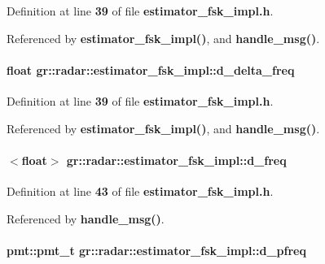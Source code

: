Definition at line {\bf 39} of file {\bf estimator\+\_\+fsk\+\_\+impl.\+h}.



Referenced by {\bf estimator\+\_\+fsk\+\_\+impl()}, and {\bf handle\+\_\+msg()}.

\paragraph[{d\+\_\+delta\+\_\+freq}]{\setlength{\rightskip}{0pt plus 5cm}float gr\+::radar\+::estimator\+\_\+fsk\+\_\+impl\+::d\+\_\+delta\+\_\+freq}\label{classgr_1_1radar_1_1estimator__fsk__impl_a1ffe1187745411015b8bb2a5121fae5b}


Definition at line {\bf 39} of file {\bf estimator\+\_\+fsk\+\_\+impl.\+h}.



Referenced by {\bf estimator\+\_\+fsk\+\_\+impl()}, and {\bf handle\+\_\+msg()}.

\paragraph[{d\+\_\+freq}]{$<$float$>$ gr\+::radar\+::estimator\+\_\+fsk\+\_\+impl\+::d\+\_\+freq}\label{classgr_1_1radar_1_1estimator__fsk__impl_ad594bbcbe2f3bb3b717ab3f590a856b1}


Definition at line {\bf 43} of file {\bf estimator\+\_\+fsk\+\_\+impl.\+h}.



Referenced by {\bf handle\+\_\+msg()}.

\paragraph[{d\+\_\+pfreq}]{\setlength{\rightskip}{0pt plus 5cm}pmt\+::pmt\+\_\+t gr\+::radar\+::estimator\+\_\+fsk\+\_\+impl\+::d\+\_\+pfreq}\label{classgr_1_1radar_1_1estimator__fsk__impl_aecf49492caf4b497f4c6a7587864dd0c}



